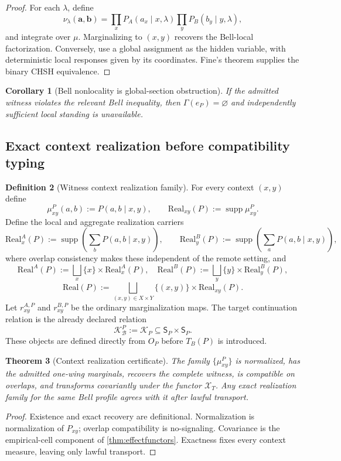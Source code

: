 \documentclass[11pt]{article}
\newtheorem{theorem}{Theorem}[section]
\newtheorem{corollary}[theorem]{Corollary}
\theoremstyle{definition}
\newtheorem{definition}[theorem]{Definition}
\newcommand{\Bell}{\mathcal{B}}
\newcommand{\Real}{\mathrm{Real}}
\newcommand{\GlobalSec}{\Gamma}
\begin{document}
\begin{proof}
For each $\lambda$, define
\[
\nu_{\lambda}(\mathbf a,\mathbf b)=
\prod_xP_A(a_x\mid x,\lambda)\prod_yP_B(b_y\mid y,\lambda),
\]
and integrate over $\mu$. Marginalizing to $(x,y)$ recovers the Bell-local factorization. Conversely, use a global assignment as the hidden variable, with deterministic local responses given by its coordinates. Fine's theorem supplies the binary CHSH equivalence.
\end{proof}

\begin{corollary}[Bell nonlocality is global-section obstruction]\label{cor:localstandingexcluded}
If the admitted witness violates the relevant Bell inequality, then $\GlobalSec(e_P)=\varnothing$ and independently sufficient local standing is unavailable.
\end{corollary}

\subsection{Exact context realization before compatibility typing}

\begin{definition}[Witness context realization family]\label{def:realizationpair}
For every context $(x,y)$ define
\[
\mu^{P}_{xy}(a,b):=P(a,b\mid x,y),
\qquad
\Real_{xy}(P):=\operatorname{supp}\mu^{P}_{xy}.
\]
Define the local and aggregate realization carriers
\[
\Real^A_x(P):=\operatorname{supp}\!\left(\sum_bP(a,b\mid x,y)\right),
\qquad
\Real^B_y(P):=\operatorname{supp}\!\left(\sum_aP(a,b\mid x,y)\right),
\]
where overlap consistency makes these independent of the remote setting, and
\[
\Real^A(P):=\bigsqcup_x\{x\}\times\Real^A_x(P),\quad
\Real^B(P):=\bigsqcup_y\{y\}\times\Real^B_y(P),
\]
\[
\Real(P):=\bigsqcup_{(x,y)\in X\times Y}\{(x,y)\}\times\Real_{xy}(P).
\]
Let $r^{A,P}_{xy}$ and $r^{B,P}_{xy}$ be the ordinary marginalization maps. The target continuation relation is the already declared relation
\[
\mathcal K^{P}_{\Bell}:=\mathcal K_P\subseteq\mathsf S_P\times\mathsf S_P.
\]
These objects are defined directly from $O_P$ before $T_B(P)$ is introduced.
\end{definition}

\begin{theorem}[Context realization certificate]\label{thm:realizationrecovery}
The family $\{\mu^{P}_{xy}\}$ is normalized, has the admitted one-wing marginals, recovers the complete witness, is compatible on overlaps, and transforms covariantly under the functor $\mathscr X_T$. Any exact realization family for the same Bell profile agrees with it after lawful transport.
\end{theorem}
\begin{proof}
Existence and exact recovery are definitional. Normalization is normalization of $P_{xy}$; overlap compatibility is no-signaling. Covariance is the empirical-cell component of \cref{thm:effectfunctors}. Exactness fixes every context measure, leaving only lawful transport.
\end{proof}
\end{document}
